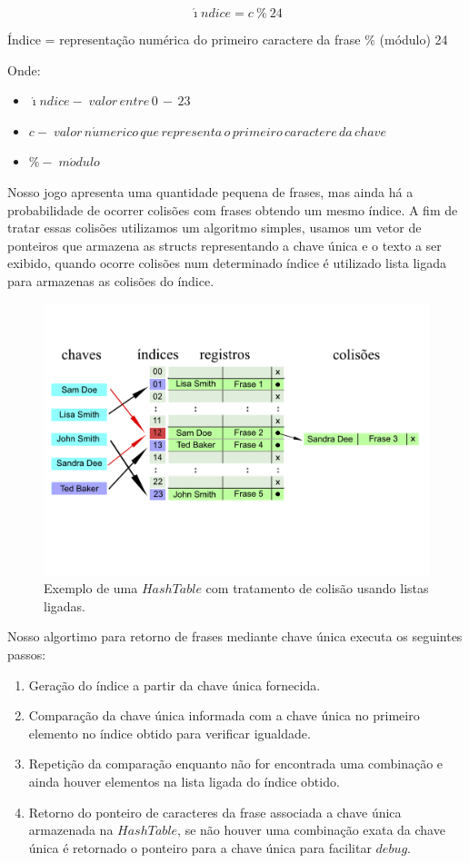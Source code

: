 \documentclass[12pt]{article}
\begin{document}
\begin{equation} 
\acute{\imath}ndice = c\ \%\  24
\end{equation}


Índice = representação numérica do primeiro caractere da frase \% (módulo) 24

Onde:

\begin{itemize}  
  \item $\acute{\imath}ndice -\; valor\,entre\,0\,-\,23 $
  \item $c -\; valor\,n\acute{u}merico\,que\,representa\,o\,primeiro\,caractere\,da\,chave$
  \item $\% -\; m\acute{o}dulo$
\end{itemize}

Nosso jogo apresenta uma quantidade pequena de frases, mas ainda há a probabilidade de ocorrer colisões com frases obtendo um mesmo índice. A fim de tratar essas colisões utilizamos um algoritmo simples, usamos um vetor de ponteiros que armazena as structs representando a chave única e o texto a ser exibido, quando ocorre colisões num determinado índice é utilizado lista ligada para armazenas as colisões do índice.


\begin{figure}[H]
\centering
\includegraphics[width=.80\textwidth]{hash_table.pdf}
\caption{Exemplo de uma $Hash Table$ com tratamento de colisão usando listas ligadas.} \label{hash}
\end{figure}

Nosso algortimo para retorno de frases mediante chave única executa os seguintes passos:


\begin{enumerate} 
	\item Geração do índice a partir da chave única fornecida.
	\item  Comparação da chave única informada com a chave única no primeiro elemento no índice obtido para verificar igualdade.
\item Repetição da comparação enquanto não for encontrada uma combinação e ainda houver elementos na lista ligada do índice obtido.  
\item Retorno do ponteiro de caracteres da frase associada a chave única armazenada na $Hash Table$, se não houver uma combinação exata da chave única é retornado o ponteiro para a chave única para facilitar $debug$. 
\end{enumerate}
 
\end{document}
